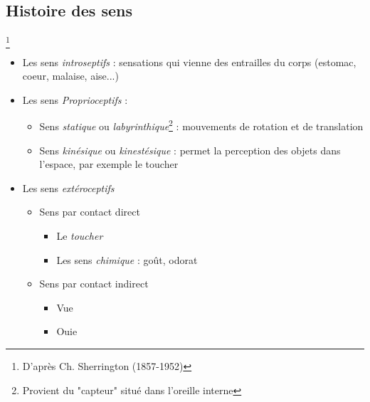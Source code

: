 \subsection{Histoire des sens} \footnote{D'après Ch. Sherrington (1857-1952)}
\begin{itemize}
    \item Les sens \textit{introseptifs} : sensations qui vienne des entrailles du corps (estomac, coeur, malaise, aise...)
    \item Les sens \textit{Proprioceptifs} : 
        \begin{itemize}
            \item Sens \textit{statique} ou \textit{labyrinthique}\footnote{Provient du "capteur" situé dans l'oreille interne} : mouvements de rotation et de translation
            \item Sens \textit{kinésique} ou \textit{kinestésique} : permet la perception des objets dans l'espace, par exemple le toucher
        \end{itemize}
    \item Les sens \textit{extéroceptifs}
        \begin{itemize}
            \item Sens par contact direct
                \begin{itemize}
                    \item Le \textit{toucher}
                    \item Les sens \textit{chimique} : goût, odorat
                \end{itemize}
            \item Sens par contact indirect
                \begin{itemize}
                    \item Vue
                    \item Ouie
                \end{itemize}
        \end{itemize}
\end{itemize}
